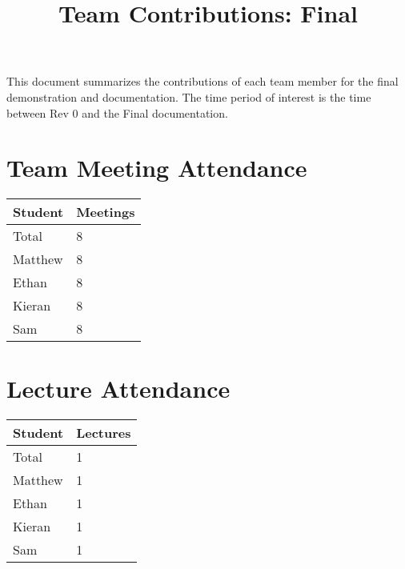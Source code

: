 \documentclass{article}
\title{Team Contributions: Final\\\progname}
\author{\authname}
\date{}
\begin{document}
\maketitle

This document summarizes the contributions of each team member for the final
demonstration and documentation.  The time period of interest is the time
between Rev 0 and the Final documentation.

\section{Team Meeting Attendance}


\begin{table}[H]
\centering
\begin{tabular}{ll}
\toprule
\textbf{Student} & \textbf{Meetings}\\
\midrule
Total & 8\\
Matthew & 8\\
Ethan & 8\\
Kieran & 8\\
Sam & 8\\
\bottomrule
\end{tabular}
\end{table}


\section{Lecture Attendance}


\begin{table}[H]
\centering
\begin{tabular}{ll}
\toprule
\textbf{Student} & \textbf{Lectures}\\
\midrule
Total & 1\\
Matthew & 1\\
Ethan & 1\\
Kieran & 1\\
Sam & 1\\
\bottomrule
\end{tabular}
\end{table}
\end{document}
